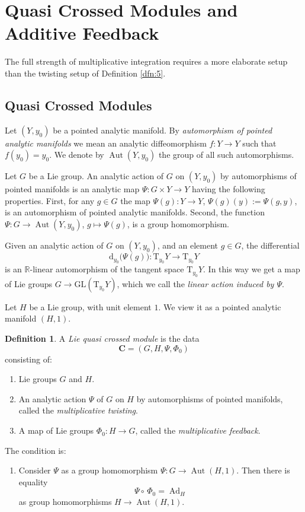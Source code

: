 \documentclass[10pt, a4paper]{amsart}
\theoremstyle{definition}
\newtheorem{dfn}[equation]{Definition}
\numberwithin{equation}{section}
\newcommand{\opn}{\operatorname}
\newcommand{\rmitem}[1]{\item[\text{\textup{(#1)}}]}
\newcommand{\mbf}[1]{\mathbf{#1}}
\newcommand{\mrm}[1]{\mathrm{#1}}
\newcommand{\mbb}[1]{\mathbb{#1}}
\newcommand{\R}{\mbb{R}}
\renewcommand{\d}{\mrm{d}}
\begin{document}
\cleardoublepage
\section{Quasi Crossed Modules and Additive Feedback}
\label{sec:LQC}

The full strength of multiplicative integration requires a more
elaborate setup than the twisting setup of Definition \ref{dfn:5}.

\subsection{Quasi Crossed Modules}
Let $(Y, y_0)$ be a pointed analytic manifold. By {\em automorphism of pointed
analytic manifolds} we mean an analytic
diffeomorphism $f : Y \to Y$ such that $f(y_0) = y_0$.
We denote by $\opn{Aut}(Y, y_0)$ the group of all such automorphisms.

Let $G$ be a Lie group. An analytic action of $G$ on $(Y, y_0)$ by
automorphisms of pointed manifolds is an analytic map
$\Psi : G \times Y \to Y$ having the following properties.
First, for any $g \in G$ the map
$\Psi(g) : Y \to Y$, $\Psi(g)(y) := \Psi(g,y)$, is an automorphism of
pointed analytic manifolds. Second, the function
$\Psi : G \to \opn{Aut}(Y, y_0)$,
$g \mapsto \Psi(g)$, is a group homomorphism.

Given an analytic action of $G$ on $(Y, y_0)$, and an element $g \in G$,
the differential
\[ \d_{y_0} \bigl( \Psi(g) \bigr) : \mrm{T}_{y_0} Y \to \mrm{T}_{y_0} Y \]
is an $\R$-linear automorphism of the tangent space 
$\mrm{T}_{y_0} Y$. In this way we get a map of Lie groups
$G \to \mrm{GL}(\mrm{T}_{y_0} Y)$, which we call the {\em linear action
induced by $\Psi$}.

Let $H$ be a Lie group, with unit element $1$. We view it as a
pointed analytic manifold $(H, 1)$.

\begin{dfn} \label{dfn:22}
A {\em Lie quasi crossed module} 
is the data 
\[ \mbf{C} = (G, H, \Psi, \Phi_0) \]
consisting of:
\begin{enumerate}
\item Lie groups $G$ and $H$.
%
\item An analytic action $\Psi$ of $G$ on $H$ by automorphisms of
pointed manifolds, called the {\em multiplicative twisting}.
%
\item A map of Lie groups $\Phi_0 : H \to G$, called the {\em
multiplicative feedback}.
\end{enumerate}
The condition is:
\begin{enumerate}
\rmitem{$*$} Consider $\Psi$ as a group homomorphism
$\Psi : G \to \opn{Aut}(H, 1)$. Then there is equality
\[ \Psi \circ\, \Phi_0 = \opn{Ad}_H \]
as group homomorphisms $H \to \opn{Aut}(H, 1)$.
\end{enumerate}
\end{dfn}
\end{document}
